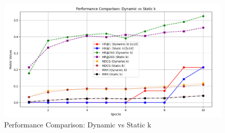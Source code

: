\documentclass{article}
\begin{document}
	\begin{figure}[ht]
	\centering
	\includegraphics[width=1.3\textwidth]{comparision.PNG}  
	\caption{Performance Comparison: Dynamic vs Static k}
	\label{fig:image1}
\end{figure}





	
\end{document}
